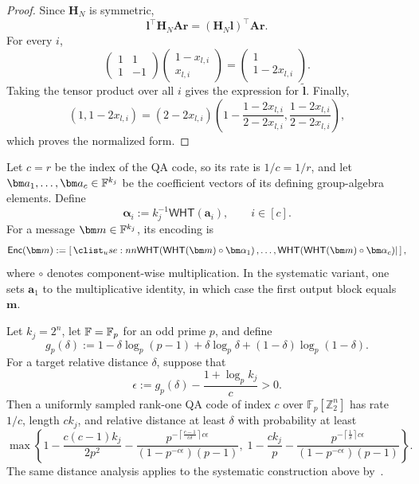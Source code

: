 \documentclass[runningheads]{llncs}
\begin{document}
\begin{proof}
Since \(\bm H_N\) is symmetric,
\[
    \bm l^\top\bm H_N\bm A\bm r
    =
    (\bm H_N\bm l)^\top\bm A\bm r.
\]
For every \(i\),
\[
    \begin{pmatrix}1&1\\1&-1\end{pmatrix}
    \begin{pmatrix}1-x_{l,i}\\x_{l,i}\end{pmatrix}
    =
    \begin{pmatrix}1\\1-2x_{l,i}\end{pmatrix}.
\]
Taking the tensor product over all \(i\) gives the expression for
\(\widetilde{\bm l}\).  Finally,
\[
    (1,1-2x_{l,i})
    =
    (2-2x_{l,i})
    \left(
        1-\frac{1-2x_{l,i}}{2-2x_{l,i}},
        \frac{1-2x_{l,i}}{2-2x_{l,i}}
    \right),
\]
which proves the normalized form.
\end{proof}

\begin{definition}
Let \(c=r\) be the index of the QA code, so its rate is \(1/c=1/r\), and let
\(\bm a_1,\ldots,\bm a_c\in\Field^{k_j}\) be the coefficient vectors of
its defining group-algebra elements.  Define
\[
    \bm\alpha_i
    :=
    k_j^{-1}\mathsf{WHT}(\bm a_i),
    \qquad i\in[c].
\]
For a message \(\bm m\in\Field^{k_j}\), its encoding is
\[
    \Enc(\bm m)
    :=
    \concat{
        \mathsf{WHT}\!\left(
            \mathsf{WHT}(\bm m)\circ\bm\alpha_1
        \right),
        \ldots,
        \mathsf{WHT}\!\left(
            \mathsf{WHT}(\bm m)\circ\bm\alpha_c
        \right)
    },
\]
where \(\circ\) denotes component-wise multiplication.
In the systematic variant, one sets \(\bm a_1\) to the multiplicative
identity, in which case the first output block equals \(\bm m\).
\end{definition}

\begin{fact}
\label{fact:qa-distance}
Let \(k_j=2^n\), let \({\mathbb{F}}=\mathbb F_p\) for an odd prime \(p\), and define
\[
    g_p(\delta)
    :=
    1-\delta\log_p(p-1)
      +\delta\log_p\delta
      +(1-\delta)\log_p(1-\delta).
\]
For a target relative distance \(\delta\), suppose that
\[
    \epsilon
    :=
    g_p(\delta)-\frac{1+\log_p k_j}{c}
    >0.
\]
Then a uniformly sampled rank-one QA code of index \(c\) over
\(\mathbb F_p[\mathbb Z_2^n]\) has rate \(1/c\), length \(ck_j\), and
relative distance at least \(\delta\) with probability at least
\[
    \max\left\{
        1-\frac{c(c-1)k_j}{2p^2}
          -\frac{
              p^{-\left\lceil\frac{c-1}{c\delta}\right\rceil c\epsilon}
          }{
              (1-p^{-c\epsilon})(p-1)
          },
        \;
        1-\frac{ck_j}{p}
          -\frac{
              p^{-\left\lceil\frac{1}{\delta}\right\rceil c\epsilon}
          }{
              (1-p^{-c\epsilon})(p-1)
          }
    \right\}.
\]
The same distance analysis applies to the systematic construction above
by~\cite[Theorem~4.4]{iacr/LiLXYY26}.
\end{fact}
\end{document}
